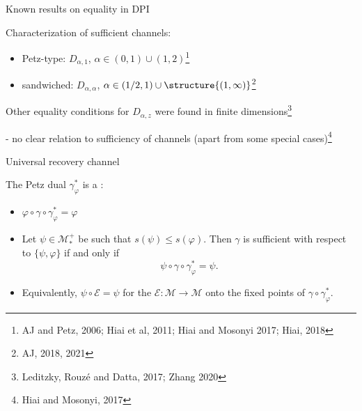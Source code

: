 \documentclass[mathserif]{beamer}
\newcommand{\<}{\langle}
\renewcommand{\>}{\rangle}
\newcommand{\Ee}{\mathcal E}
\newcommand{\Me}{\mathcal M}
\newcommand{\myfootnote}[1]{
    \renewcommand{\thefootnote}{}
    \footnotetext{\hspace{-16.5pt}\scriptsize#1}
    \renewcommand{\thefootnote}{\arabic{footnote}}
}
\begin{document}
\begin{frame}{Known results on equality in DPI}

Characterization of sufficient channels:

\bigskip

\begin{itemize}
\item Petz-type: $D_{\alpha,1}$, $\alpha\in (0,1)\cup (1,2)$\footnote{AJ and Petz, 2006;
Hiai et al, 2011; 
Hiai and Mosonyi 2017; Hiai, 2018}


\medskip

\item sandwiched: $D_{\alpha,\alpha}$, $\alpha\in (1/2,1)\cup\structure{(1,\infty)}$\footnote{AJ,
2018, 2021}

\end{itemize}

\bigskip

Other equality conditions for $D_{\alpha,z}$ were found in finite dimensions\footnote{Leditzky, Rouz\'e and
Datta, 2017; Zhang 2020}
\medskip

- no clear relation to sufficiency of channels (apart from some special
cases)\footnote{Hiai and Mosonyi, 2017}


\end{frame}



\begin{frame}{Universal recovery channel}


The Petz dual $\gamma_\varphi^*$ is a :\myfootnote{Petz, 1986, 1988}
\medskip

\begin{itemize}
\item $\varphi\circ \gamma\circ\gamma_\varphi^*=\varphi$

\medskip

\item Let $\psi\in \Me_*^+$ be such that  $s(\psi)\le s(\varphi)$. Then  $\gamma$ is
sufficient with respect to $\{\psi,\varphi\}$ if and only if 
\[
\psi\circ \gamma\circ \gamma_\varphi^*=\psi.
\]

\item Equivalently, 
$\psi\circ \Ee=\psi$ 
for the  $\Ee:\Me\to \Me$ onto the fixed points of $\gamma\circ
\gamma_\varphi^*$.
\end{itemize}





\end{frame}
\end{document}
